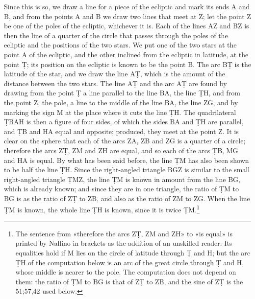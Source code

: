\documentclass[11pt]{article}
\newcommand{\ArPage}[1]{\marginpar{\footnotesize\color{gray}Ar.\,p.\,#1}}
\begin{document}
\par \ArPage{58}Since this is so, we draw a line for a piece of the ecliptic and mark its ends A and B, and from the points A and B we draw two lines that meet at Z; let the point Z be one of the poles of the ecliptic, whichever it is. Each of the lines AZ and BZ is then the line of a quarter of the circle that passes through the poles of the ecliptic and the positions of the two stars. We put one of the two stars at the point A of the ecliptic, and the other inclined from the ecliptic in latitude, at the point Ṭ; its position on the ecliptic is known to be the point B. The arc BṬ is the latitude of the star, and we draw the line AṬ, which is the amount of the distance between the two stars. The line AṬ and the arc AṬ are found by drawing from the point Ṭ a line parallel to the line BA, the line ṬH, and from the point Z, the pole, a line to the middle of the line BA, the line ZG, and by marking the sign M at the place where it cuts the line ṬH. The quadrilateral ṬBAH is then a figure of four sides, of which the sides BA and ṬH are parallel, and ṬB and HA equal and opposite; produced, they meet at the point Z. It is clear on the sphere that each of the arcs ZA, ZB and ZG is a quarter of a circle; therefore the arcs ZṬ, ZM and ZH are equal, and so each of the arcs ṬB, MG and HA is equal. By what has been said before, the line ṬM has also been shown to be half the line ṬH. Since the right-angled triangle BGZ is similar to the small right-angled triangle ṬMZ, the line ṬM is known in amount from the line BG, which is already known; and since they are in one triangle, the ratio of ṬM to BG is as the ratio of ZṬ to ZB, and also as the ratio of ZM to ZG. When the line ṬM is known, the whole line ṬH is known, since it is twice ṬM.\footnote{The sentence from «therefore the arcs ZṬ, ZM and ZH» to «is equal» is printed by Nallino in brackets as the addition of an unskilled reader. Its equalities hold if M lies on the circle of latitude through Ṭ and H; but the arc ṬH of the computation below is an arc of the great circle through Ṭ and H, whose middle is nearer to the pole. The computation does not depend on them: the ratio of ṬM to BG is that of ZṬ to ZB, and the sine of ZṬ is the 51;57,42 used below.}\par
\end{document}
